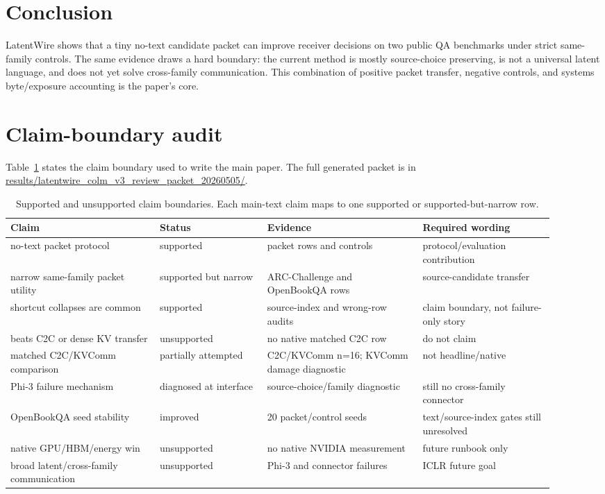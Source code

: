\documentclass{article}
\newcommand{\method}{LatentWire}
\newcommand{\arc}{ARC-Challenge}
\newcommand{\obqa}{OpenBookQA}
\begin{document}
\section{Conclusion}

\method{} shows that a tiny no-text candidate packet can improve receiver decisions on two public QA benchmarks under strict same-family controls. The same evidence draws a hard boundary: the current method is mostly source-choice preserving, is not a universal latent language, and does not yet solve cross-family communication. This combination of positive packet transfer, negative controls, and systems byte/exposure accounting is the paper's core.




\appendix

\section{Claim-boundary audit}

Table~\ref{tab:claim-audit} states the claim boundary used to write the main paper. The full generated packet is in \url{results/latentwire_colm_v3_review_packet_20260505/}.

\begin{table}[h]
  \centering
  \scriptsize
  \setlength{\tabcolsep}{3pt}
  \begin{tabular}{p{0.25\linewidth}p{0.18\linewidth}p{0.26\linewidth}p{0.22\linewidth}}
    \toprule
    Claim & Status & Evidence & Required wording \\
    \midrule
    no-text packet protocol & supported & packet rows and controls & protocol/evaluation contribution \\
    narrow same-family packet utility & supported but narrow & \arc{} and \obqa{} rows & source-candidate transfer \\
    shortcut collapses are common & supported & source-index and wrong-row audits & claim boundary, not failure-only story \\
    beats C2C or dense KV transfer & unsupported & no native matched C2C row & do not claim \\
    matched C2C/KVComm comparison & partially attempted & C2C/KVComm n=16; KVComm damage diagnostic & not headline/native \\
    Phi-3 failure mechanism & diagnosed at interface & source-choice/family diagnostic & still no cross-family connector \\
    \obqa{} seed stability & improved & 20 packet/control seeds & text/source-index gates still unresolved \\
    native GPU/HBM/energy win & unsupported & no native NVIDIA measurement & future runbook only \\
    broad latent/cross-family communication & unsupported & Phi-3 and connector failures & ICLR future goal \\
    \bottomrule
  \end{tabular}
  \caption{Supported and unsupported claim boundaries. Each main-text claim maps to one supported or supported-but-narrow row.}
  \label{tab:claim-audit}
\end{table}
\end{document}
